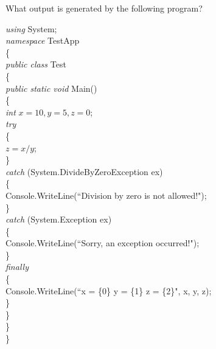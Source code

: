{\begin{list}{E \thechapter.\theenumi}

\item What output is generated by the following program?

\emph{using} System;\\
\emph{namespace} TestApp\\
\{\\
\hspace*{0.2in} \emph{public class} Test\\
\hspace*{0.2in}   \{\\
\hspace*{0.4in}        \emph{public static void} Main()\\
\hspace*{0.4in}        \{\\
\hspace*{0.6in}            \emph{int} $x = 10, y = 5, z = 0$;\\
\hspace*{0.6in}            \emph{try}\\
\hspace*{0.6in}            \{\\
\hspace*{0.8in}                $z = x / y$;\\
\hspace*{0.6in}            \}\\
\hspace*{0.6in}            \emph{catch} (System.DivideByZeroException ex)\\
\hspace*{0.6in}            \{\\
\hspace*{0.8in}                Console.WriteLine(``Division by
zero is not allowed!");\\
\hspace*{0.6in}            \}\\
\hspace*{0.6in}            \emph{catch} (System.Exception ex)\\
\hspace*{0.6in}            \{\\
\hspace*{0.8in}                Console.WriteLine(``Sorry, an
exception occurred!");\\
\hspace*{0.6in}            \}\\
\hspace*{0.6in}            \emph{finally}\\
\hspace*{0.6in}            \{\\
\hspace*{0.8in} Console.WriteLine(``x = \{0\}  y =
\{1\}  z = \{2\}", x, y, z);\\
\hspace*{0.6in}            \}\\
\hspace*{0.4in}        \}\\
\hspace*{0.2in}    \}\\
\}



\end{list}}
